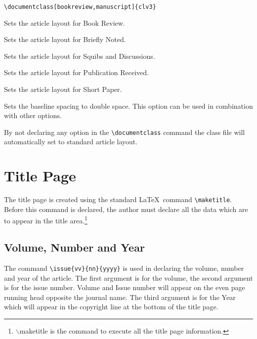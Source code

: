 \documentclass{clv3}
\begin{document}
\verb|\documentclass[bookreview,manuscript]{clv3}|


\begin{deflist}
\item[bookreview] Sets the article layout for Book Review.
\item[brief] Sets the article layout for Briefly Noted.
\item[discussion] Sets the article layout for Squibs and Discussions.
\item[pubrec] Sets the article layout for Publication Received.
\item[shortpaper] Sets the article layout for Short Paper.
\item[manuscript] Sets the baseline spacing to double space. This 
option can be used in combination with other options.
\end{deflist}

By not declaring any option in the \verb|\documentclass| command the class file
will automatically set to standard article layout.

\section{Title Page}

The title page is created using the standard \LaTeX\ command \verb|\maketitle|. 
Before this command is declared, the author must declare all the data which are 
to appear in the title area.\footnote{$\backslash$maketitle is the command to execute all the title page information.}

\subsection{Volume, Number and Year}

The command \verb|\issue{vv}{nn}{yyyy}| is used in declaring the volume, number
and year of the article. The first argument is for the volume, the second argument 
is for the issue number. Volume and Issue number will appear on the even page 
running head opposite the journal name. The third argument is for the Year which 
will appear in the copyright line at the bottom of the title page.
\end{document}
